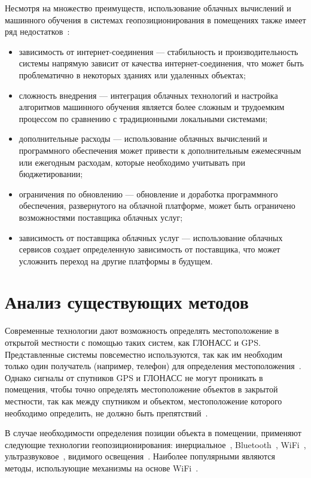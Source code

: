 Несмотря на множество преимуществ, использование облачных вычислений и машинного обучения в системах геопозиционирования в помещениях также имеет ряд недостатков~\cite{cloudML}:

\begin{itemize}[label=---]
    \item зависимость от интернет-соединения --- стабильность и производительность системы напрямую зависит от качества интернет-соединения, что может быть проблематично в некоторых зданиях или удаленных объектах;
    \item сложность внедрения --- интеграция облачных технологий и настройка алгоритмов машинного обучения является более сложным и трудоемким процессом по сравнению с традиционными локальными системами;
    \item дополнительные расходы --- использование облачных вычислений и программного обеспечения может привести к дополнительным ежемесячным или ежегодным расходам, которые необходимо учитывать при бюджетировании;
    \item ограничения по обновлению --- обновление и доработка программного обеспечения, развернутого на облачной платформе, может быть ограничено возможностями поставщика облачных услуг;
    \item зависимость от поставщика облачных услуг --- использование облачных сервисов создает определенную зависимость от поставщика, что может усложнить переход на другие платформы в будущем.
\end{itemize}

\section{Анализ существующих методов}

Современные технологии дают возможность определять местоположение в открытой местности с помощью таких систем, как ГЛОНАСС и GPS. Представленные системы повсеместно используются, так как им необходим только один получатель (например, телефон) для определения местоположения~\cite{trends}. Однако сигналы от спутников GPS и ГЛОНАСС не могут проникать в помещения, чтобы точно определять местоположение объектов в закрытой местности, так как между спутником и объектом, местоположение которого необходимо определить, не должно быть препятствий~\cite{IGS}. 

В случае необходимости определения позиции объекта в помещении, применяют следующие технологии геопозиционирования: инерциальное~\cite{inertial}, Bluetooth~\cite{bluetooth}, WiFi~\cite{wifi}, ультразвуковое~\cite{ultrasound}, видимого освещения~\cite{light}. Наиболее популярными являются методы, использующие механизмы на основе WiFi~\cite{trends}.

